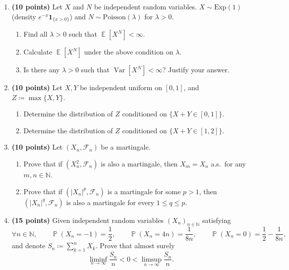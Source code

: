 \documentclass[11pt,a4paper]{article}
\DeclareMathOperator{\Var}{Var}
\DeclareMathOperator{\E}{\mathbb{E}}
\DeclareMathOperator{\Pbb}{\mathbb{P}}
\begin{document}
\begin{enumerate}[label=\textbf{\arabic*.}]
    \item \textbf{(10 points)} Let $X$ and $N$ be independent random variables. $X \sim \mathrm{Exp}(1)$ (density $e^{-x}\mathbf{1}_{\{x > 0\}}$) and $N \sim \mathrm{Poisson}(\lambda)$ for $\lambda > 0$.
    \begin{enumerate}[label=(\alph*)]
        \item Find all $\lambda > 0$ such that $\E[X^N] < \infty$.
        \item Calculate $\E[X^N]$ under the above condition on $\lambda$.
        \item Is there any $\lambda > 0$ such that $\Var[X^N] < \infty$? Justify your answer.
    \end{enumerate}

    \item \textbf{(10 points)} Let $X, Y$ be independent uniform on $[0, 1]$, and $Z \coloneqq \max\{X, Y\}$.
    \begin{enumerate}[label=(\alph*)]
        \item Determine the distribution of $Z$ conditioned on $\{X + Y \in [0, 1]\}$.
        \item Determine the distribution of $Z$ conditioned on $\{X + Y \in [1, 2]\}$.
    \end{enumerate}

    \item \textbf{(10 points)} Let $(X_n, \mathcal{F}_n)$ be a martingale.
    \begin{enumerate}[label=(\alph*)]
        \item Prove that if $(X_n^2, \mathcal{F}_n)$ is also a martingale, then $X_m = X_n$ a.s.\ for any $m, n \in \mathbb{N}$.
        \item Prove that if $(|X_n|^p, \mathcal{F}_n)$ is a martingale for some $p > 1$, then $(|X_n|^q, \mathcal{F}_n)$ is also a martingale for every $1 \le q \le p$.
    \end{enumerate}

    \item \textbf{(15 points)} Given independent random variables $(X_n)_{n \in \mathbb{N}}$ satisfying
    \[
    \forall n \in \mathbb{N}, \qquad \Pbb(X_n = -1) = \frac{1}{2}, \qquad \Pbb(X_n = 4n) = \frac{1}{8n}, \qquad \Pbb(X_n = 0) = \frac{1}{2} - \frac{1}{8n},
    \]
    and denote $S_n \coloneqq \sum_{k=1}^n X_k$. Prove that almost surely
    \[
    \liminf_{n \to \infty} \frac{S_n}{n} < 0 < \limsup_{n \to \infty} \frac{S_n}{n}.
    \]


\end{enumerate}
\end{document}
